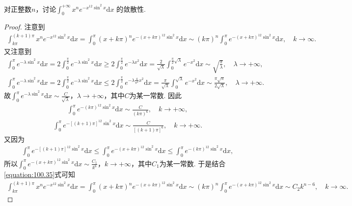 \documentclass[../../main.tex]{subfiles}%
\begin{document}
\begin{example}
对正整数\(n\)，讨论$\int_{0}^{+\infty}x^{n}e^{-x^{12}\sin^{2}x}\mathrm{d}x$
的敛散性. 
\end{example}
\begin{proof}

注意到
\begin{align}\label{equation:100.35}
\int_{k\pi}^{(k+1)\pi}x^ne^{-x^{12}\sin^2x}\mathrm{d}x=\int_0^{\pi}(x+k\pi)^ne^{-(x+k\pi)^{12}\sin^2x}\mathrm{d}x\sim (k\pi)^n\int_0^{\pi}e^{-(x+k\pi)^{12}\sin^2x}\mathrm{d}x,\quad k\rightarrow \infty.
\end{align}
又注意到
\begin{align*}
\int_0^{\pi}e^{-\lambda \sin^2x}\mathrm{d}x=2\int_0^{\frac{\pi}{2}}e^{-\lambda \sin^2x}\mathrm{d}x\geqslant 2\int_0^{\frac{\pi}{2}}e^{-\lambda x^2}\mathrm{d}x=\frac{2}{\sqrt{\lambda}}\int_0^{\frac{\pi}{2}\sqrt{\lambda}}e^{-x^2}\mathrm{d}x\sim \sqrt{\frac{\pi}{\lambda}},\quad \lambda \rightarrow +\infty,
\end{align*}
\begin{align*}
\int_0^{\pi}e^{-\lambda \sin^2x}\mathrm{d}x=2\int_0^{\frac{\pi}{2}}e^{-\lambda \sin^2x}\mathrm{d}x\leqslant 2\int_0^{\frac{\pi}{2}}e^{-\lambda \frac{4}{\pi^2}x^2}\mathrm{d}x=\frac{\pi}{\sqrt{\lambda}}\int_0^{\sqrt{\lambda}}e^{-x^2}\mathrm{d}x\sim \frac{\pi \sqrt{\pi}}{2\sqrt{\lambda}},\quad \lambda \rightarrow +\infty.
\end{align*}
故$\int_0^{\pi}e^{-\lambda \sin^2x}\mathrm{d}x\sim \frac{C}{\sqrt{\lambda}}$，$\lambda \rightarrow +\infty$，其中$C$为某一常数. 因此
\begin{align*}
\int_0^{\pi}e^{-(k\pi)^{12}\sin^2x}\mathrm{d}x\sim \frac{C}{(k\pi)^6},\quad k\rightarrow +\infty,
\end{align*}
\begin{align*}
\int_0^{\pi}e^{-[(k+1)\pi]^{12}\sin^2x}\mathrm{d}x\sim \frac{C}{[(k+1)\pi]^6},\quad k\rightarrow +\infty.
\end{align*}
又因为
\begin{align*}
\int_0^{\pi}e^{-[(k+1)\pi]^{12}\sin^2x}\mathrm{d}x\leqslant \int_0^{\pi}e^{-(x+k\pi)^{12}\sin^2x}\mathrm{d}x\leqslant \int_0^{\pi}e^{-(k\pi)^{12}\sin^2x}\mathrm{d}x,
\end{align*}
所以$\int_0^{\pi}e^{-(x+k\pi)^{12}\sin^2x}\mathrm{d}x\sim \frac{C_1}{k^6}$，$k\rightarrow +\infty$，其中$C_1$为某一常数. 于是结合\eqref{equation:100.35}式可知
\begin{align*}
\int_{k\pi}^{(k+1)\pi}x^ne^{-x^{12}\sin^2x}\mathrm{d}x=\int_0^{\pi}(x+k\pi)^ne^{-(x+k\pi)^{12}\sin^2x}\mathrm{d}x\sim (k\pi)^n\int_0^{\pi}e^{-(x+k\pi)^{12}\sin^2x}\mathrm{d}x\sim C_2k^{n-6},\quad k\rightarrow \infty.

\end{align*}
\end{proof}
\end{document}
